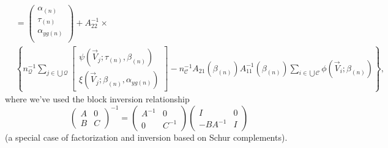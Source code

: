 \documentclass{article}
\begin{document}
\begin{align}
    &=\begin{pmatrix}\alpha_{(n)}\\
                         \tau_{(n)}\\ \alpha_{yg(n)} \\ \end{pmatrix} +
    A_{22}^{-1}\times \label{eq:20}\\
    & \left\{
                 n_{\mathcal{Q}}^{-1}\sum_{j\in \bigcup
                 \mathcal{Q}}\begin{bmatrix} \psi(\vec{V}_{j};
                 \tau_{(n)},\beta_{(n)} )\\ \xi(\vec{V}_{j}; \beta_{(n)}, \alpha_{yg(n)}) \end{bmatrix} - n_{\mathcal{C}}^{-1}A_{21}(\beta_{(n)}) A_{11}^{-1}(\beta_{(n)})\sum_{i\in \bigcup \mathcal{C}}\phi(\vec{V}_{i}; \beta_{(n)})\right\},\nonumber
\end{align}
where we've used the block inversion relationship
\begin{equation*}
  \label{eq:23}
  \left(\begin{array}{cc}A & 0 \\ B & C \end{array} \right)^{-1} =
  \left(\begin{array}{cc}A^{-1} & 0 \\ 0 & C^{-1} \end{array} \right)
  \left(\begin{array}{cc} I & 0 \\ -BA^{-1} & I \end{array} \right)
\end{equation*}
(a special case of factorization and inversion based on Schur complements).
\end{document}
